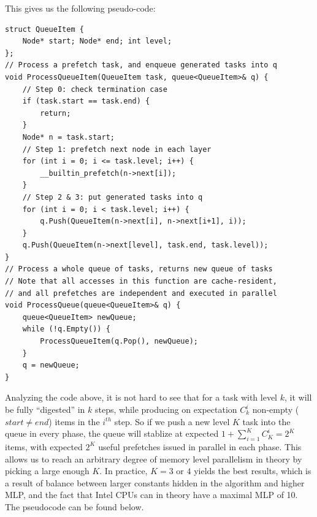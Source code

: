 \documentclass[11pt, usletter]{article}
\begin{document}
This gives us the following pseudo-code:

\singlespacing\begin{codebox}
\begin{verbatim}
struct QueueItem {
    Node* start; Node* end; int level;
};
// Process a prefetch task, and enqueue generated tasks into q
void ProcessQueueItem(QueueItem task, queue<QueueItem>& q) {
    // Step 0: check termination case
    if (task.start == task.end) {
        return;
    }
    Node* n = task.start;
    // Step 1: prefetch next node in each layer
    for (int i = 0; i <= task.level; i++) {
        __builtin_prefetch(n->next[i]);
    }
    // Step 2 & 3: put generated tasks into q
    for (int i = 0; i < task.level; i++) {
        q.Push(QueueItem(n->next[i], n->next[i+1], i));
    }
    q.Push(QueueItem(n->next[level], task.end, task.level));
}
// Process a whole queue of tasks, returns new queue of tasks
// Note that all accesses in this function are cache-resident,
// and all prefetches are independent and executed in parallel
void ProcessQueue(queue<QueueItem>& q) {
    queue<QueueItem> newQueue;
    while (!q.Empty()) {
        ProcessQueueItem(q.Pop(), newQueue);
    }
    q = newQueue;
}	
\end{verbatim}
\end{codebox}\doublespacing

Analyzing the code above, it is not hard to see that for a task with level $k$, 
it will be fully ``digested'' in $k$ steps, 
while producing on expectation $C_k^i$ non-empty ($start\neq end$) items in the $i^{th}$ step. 
So if we push a new level $K$ task into the queue in every phase, 
the queue will stablize at expected $1+\sum_{i=1}^K C_K^i=2^K$ items, 
with expected $2^K$ useful prefetches issued in parallel in each phase.
This allows us to reach an arbitrary degree of memory level parallelism in theory by picking a large enough $K$.
In practice, $K=3$ or $4$ yields the best results, 
which is a result of balance between larger constants hidden in the algorithm and higher MLP, 
and the fact that Intel CPUs can in theory have a maximal MLP of 10.
The pseudocode can be found below.
\end{document}
